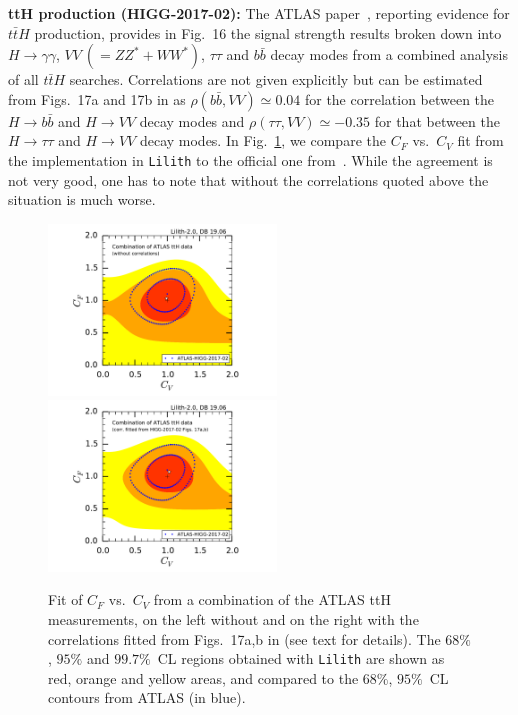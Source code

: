 
{\bf\boldmath ttH production (HIGG-2017-02):} The ATLAS paper~\cite{Aaboud:2017jvq}, reporting evidence for $t\bar tH$ production,  
provides in Fig.~16 the signal strength results broken down into $H\to \gamma\gamma$, $VV~(=ZZ^*+WW^*)$, $\tau\tau$ and $b\bar b$ 
decay modes from a combined analysis of all $t\bar tH$ searches.  
Correlations are not given explicitly but can be estimated from %
Figs.~17a and 17b in \cite{Aaboud:2017jvq} 
as $\rho(b\bar b, VV)\simeq 0.04$ for the correlation between the $H\to b\bar b$ and $H\to VV$ decay modes
and $\rho(\tau\tau, VV)\simeq -0.35$ for that between the $H\to \tau\tau$ and $H\to VV$ decay modes. 
In Fig.~\ref{fig:validation_atlas_ttH}, we compare the $C_F$ vs.\ $C_V$ fit from the implementation in {\tt Lilith} 
to the official one from~\cite{Aaboud:2017jvq}. While the agreement is not very good,  
one has to note that without the correlations quoted above the situation is much worse. 

\begin{figure}[htb!]\centering
\includegraphics[width=0.54\textwidth]{validation/ATLAS/HIGG-2017-02-CVCF-nocorr.pdf}%
\hspace{-13mm}\includegraphics[width=0.54\textwidth]{validation/ATLAS/HIGG-2017-02-CVCF-corr.pdf}%
\vspace*{-2mm}
\caption{Fit of $C_F$ vs.\ $C_V$ from a combination of the ATLAS ttH measurements, on the left without and on the 
right with the correlations fitted from Figs.~17a,b in \cite{Aaboud:2017jvq} (see text for details). 
The  $68\%$,  $95\%$ and $99.7\%$~CL regions obtained with {\tt Lilith} are shown as red, orange and yellow areas, 
and compared to the $68\%$,  $95\%$~CL contours from ATLAS (in blue).}
\label{fig:validation_atlas_ttH}
\end{figure}

